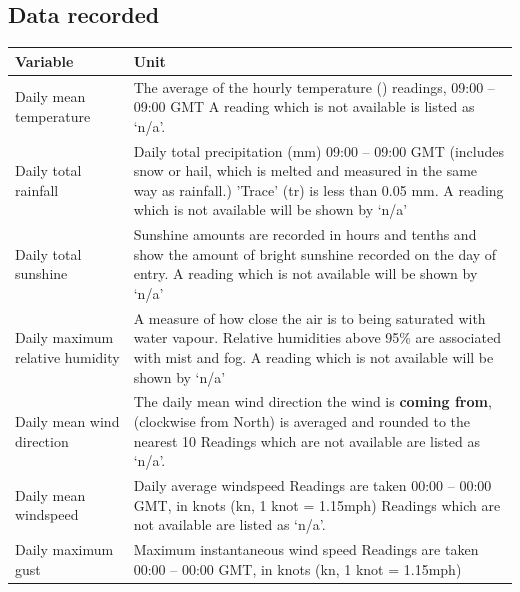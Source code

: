 \documentclass[oneside,fleqn,11pt]{book}
\begin{document}
	\subsection{Data recorded}
	\begin{tabular}{|p{5.5cm}|p{11.5cm}|}
		\hline
		\textbf{Variable} & \textbf{Unit} \\
		\hline
		Daily mean temperature & The average of the hourly temperature (\textcelsius) readings, 09:00 – 09:00 GMT \newline A reading which is not available is listed as ‘n/a’.
		\\
		\hline
		Daily total rainfall & Daily total precipitation (mm) 09:00 – 09:00 GMT
		(includes snow or hail, which is melted and measured in the same way as rainfall.) \newline
		'Trace' (tr) is less than 0.05 mm. \newline A reading which is not available will be shown by ‘n/a’
		\\
		\hline
		Daily total sunshine & Sunshine amounts are recorded in hours and tenths and show the amount of bright sunshine recorded on the day of entry. \newline A reading which is not available will be shown by ‘n/a’ \\
		\hline
		Daily maximum relative humidity & A measure of how close the air is to being saturated with water vapour. \newline Relative humidities above 95\% are associated with mist and fog. \newline A reading which is not available will be shown by ‘n/a’
		\\
		\hline
		Daily mean wind direction & The daily mean wind direction the wind is \textbf{coming from}, (clockwise from North) is averaged and rounded to the nearest 10\textdegree \newline
		Readings which are not available are listed as ‘n/a’.
		\\
		\hline
		Daily mean windspeed & Daily average windspeed \newline Readings are taken 00:00 – 00:00 GMT, in knots (kn, 1 knot = 1.15mph) \newline
		Readings which are not available are listed as ‘n/a’. \\
		\hline
		Daily maximum gust & Maximum instantaneous wind speed \newline Readings are taken 00:00 – 00:00 GMT, in knots (kn, 1 knot = 1.15mph) \newline

\end{tabular}
\end{document}

